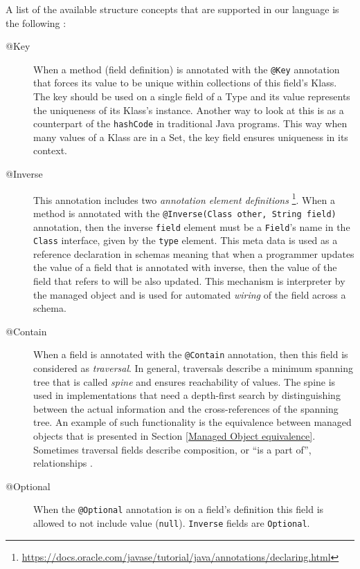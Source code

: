 A list of the available structure concepts that are supported in our language is the following \cite{loh2012managed}:
\begin{description}
	\item [@Key] When a method (field definition) is annotated with the \texttt{@Key} annotation that forces its value to be unique within collections of this field's Klass.
	The key should be used on a single field of a Type and its value represents the uniqueness of its Klass's instance.
	Another way to look at this is as a counterpart of the \texttt{hashCode} in traditional Java programs.
	This way when many values of a Klass are in a Set, the key field ensures uniqueness in its context.

	\item [@Inverse] This annotation includes two \textit{annotation element definitions} \footnote{
		\url{https://docs.oracle.com/javase/tutorial/java/annotations/declaring.html}}.
	When a method is annotated with the \texttt{@Inverse(Class other, String field)} annotation, then the inverse \texttt{field} element must be a \texttt{Field}'s name in the \texttt{Class} interface, given by the \texttt{type} element.
	This meta data is used as a reference declaration in schemas meaning that when a programmer updates the value of a field that is annotated with inverse, then the value of the field that refers to will be also updated.
	This mechanism is interpreter by the managed object and is used for automated \textit{wiring} of the field across a schema.

	\item [@Contain] When a field is annotated with the \texttt{@Contain} annotation, then this field is considered as \textit{traversal}. 
	In general, traversals describe a minimum spanning tree that is called \textit{spine} and ensures reachability of values.
	The spine is used in implementations that need a depth-first search by distinguishing between the actual information and the cross-references of the spanning tree.
	An example of such functionality is the equivalence between managed objects that is presented in Section \ref{Managed Object equivalence}.
	Sometimes traversal fields describe composition, or ``is a part of'', relationships \cite{loh2012managed}.

	\item [@Optional] When the \texttt{@Optional} annotation is on a field's definition this field is allowed to not include value (\texttt{null}).
	\texttt{Inverse} fields are \texttt{Optional}. 


\end{description}
